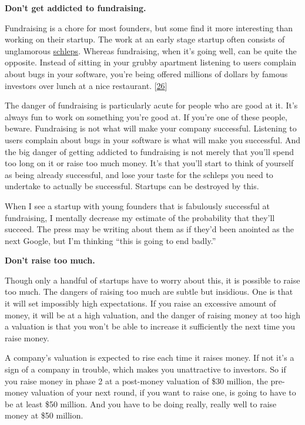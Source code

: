 \textbf{Don't get addicted to fundraising.}

Fundraising is a chore for most founders, but some find it more
interesting than working on their startup. The work at an early stage
startup often consists of unglamorous \href{schlep.html}{schleps}.
Whereas fundraising, when it's going well, can be quite the opposite.
Instead of sitting in your grubby apartment listening to users complain
about bugs in your software, you're being offered millions of dollars by
famous investors over lunch at a nice restaurant.
{[}\hyperref[f26n]{26}{]}

The danger of fundraising is particularly acute for people who are good
at it. It's always fun to work on something you're good at. If you're
one of these people, beware. Fundraising is not what will make your
company successful. Listening to users complain about bugs in your
software is what will make you successful. And the big danger of getting
addicted to fundraising is not merely that you'll spend too long on it
or raise too much money. It's that you'll start to think of yourself as
being already successful, and lose your taste for the schleps you need
to undertake to actually be successful. Startups can be destroyed by
this.

When I see a startup with young founders that is fabulously successful
at fundraising, I mentally decrease my estimate of the probability that
they'll succeed. The press may be writing about them as if they'd been
anointed as the next Google, but I'm thinking ``this is going to end
badly.''

\textbf{Don't raise too much.}

Though only a handful of startups have to worry about this, it is
possible to raise too much. The dangers of raising too much are subtle
but insidious. One is that it will set impossibly high expectations. If
you raise an excessive amount of money, it will be at a high valuation,
and the danger of raising money at too high a valuation is that you
won't be able to increase it sufficiently the next time you raise money.

A company's valuation is expected to rise each time it raises money. If
not it's a sign of a company in trouble, which makes you unattractive to
investors. So if you raise money in phase 2 at a post-money valuation of
\$30 million, the pre-money valuation of your next round, if you want to
raise one, is going to have to be at least \$50 million. And you have to
be doing really, really well to raise money at \$50 million.

